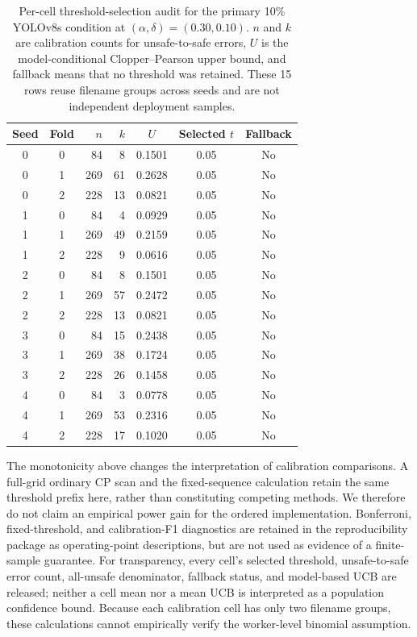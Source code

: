 \documentclass[iicol,pdflatex,sn-mathphys-num]{sn-jnl}
\begin{document}
\begin{table}[t]
\caption{Per-cell threshold-selection audit for the primary 10\% YOLOv8s condition at $(\alpha,\delta)=(0.30,0.10)$. $n$ and $k$ are calibration counts for unsafe-to-safe errors, $U$ is the model-conditional Clopper--Pearson upper bound, and fallback means that no threshold was retained. These 15 rows reuse filename groups across seeds and are not independent deployment samples.}
\label{tab:selectedthresholds}
\centering
\scriptsize
\setlength{\tabcolsep}{5pt}
\begin{tabular}{@{}c c r r c c c@{}}
\toprule
Seed & Fold & $n$ & $k$ & $U$ & Selected $t$ & Fallback \\
\midrule
0 & 0 & 84  & 8  & 0.1501 & 0.05 & No \\
0 & 1 & 269 & 61 & 0.2628 & 0.05 & No \\
0 & 2 & 228 & 13 & 0.0821 & 0.05 & No \\
1 & 0 & 84  & 4  & 0.0929 & 0.05 & No \\
1 & 1 & 269 & 49 & 0.2159 & 0.05 & No \\
1 & 2 & 228 & 9  & 0.0616 & 0.05 & No \\
2 & 0 & 84  & 8  & 0.1501 & 0.05 & No \\
2 & 1 & 269 & 57 & 0.2472 & 0.05 & No \\
2 & 2 & 228 & 13 & 0.0821 & 0.05 & No \\
3 & 0 & 84  & 15 & 0.2438 & 0.05 & No \\
3 & 1 & 269 & 38 & 0.1724 & 0.05 & No \\
3 & 2 & 228 & 26 & 0.1458 & 0.05 & No \\
4 & 0 & 84  & 3  & 0.0778 & 0.05 & No \\
4 & 1 & 269 & 53 & 0.2316 & 0.05 & No \\
4 & 2 & 228 & 17 & 0.1020 & 0.05 & No \\
\bottomrule
\end{tabular}
\end{table}

The monotonicity above changes the interpretation of calibration comparisons. A full-grid ordinary CP scan and the fixed-sequence calculation retain the same threshold prefix here, rather than constituting competing methods. We therefore do not claim an empirical power gain for the ordered implementation. Bonferroni, fixed-threshold, and calibration-F1 diagnostics are retained in the reproducibility package as operating-point descriptions, but are not used as evidence of a finite-sample guarantee. For transparency, every cell's selected threshold, unsafe-to-safe error count, all-unsafe denominator, fallback status, and model-based UCB are released; neither a cell mean nor a mean UCB is interpreted as a population confidence bound. Because each calibration cell has only two filename groups, these calculations cannot empirically verify the worker-level binomial assumption.
\end{document}
